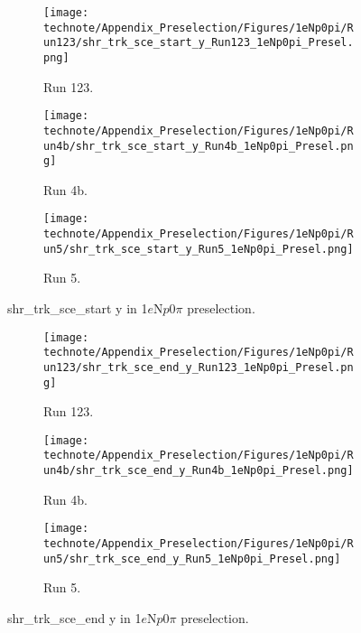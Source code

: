 \begin{figure}[H]
    \centering
    \begin{subfigure}[t]{0.32\linewidth}
        \texttt{[image: technote/Appendix\_Preselection/Figures/1eNp0pi/Run123/shr\_trk\_sce\_start\_y\_Run123\_1eNp0pi\_Presel.png]}
        \caption{Run 123.}
    \end{subfigure}%
    \hspace{0.2cm}%
    \begin{subfigure}[t]{0.32\linewidth}
        \texttt{[image: technote/Appendix\_Preselection/Figures/1eNp0pi/Run4b/shr\_trk\_sce\_start\_y\_Run4b\_1eNp0pi\_Presel.png]}
        \caption{Run 4b.}
    \end{subfigure}%
    \hspace{0.2cm}%
    \begin{subfigure}[t]{0.32\linewidth}
        \texttt{[image: technote/Appendix\_Preselection/Figures/1eNp0pi/Run5/shr\_trk\_sce\_start\_y\_Run5\_1eNp0pi\_Presel.png]}
        \caption{Run 5.}
    \end{subfigure}
    \caption{shr\_trk\_sce\_start y in 1$e$N$p$0$\pi$ preselection.}
\end{figure}

\begin{figure}[H]
    \centering
    \begin{subfigure}[t]{0.32\linewidth}
        \texttt{[image: technote/Appendix\_Preselection/Figures/1eNp0pi/Run123/shr\_trk\_sce\_end\_y\_Run123\_1eNp0pi\_Presel.png]}
        \caption{Run 123.}
    \end{subfigure}%
    \hspace{0.2cm}%
    \begin{subfigure}[t]{0.32\linewidth}
        \texttt{[image: technote/Appendix\_Preselection/Figures/1eNp0pi/Run4b/shr\_trk\_sce\_end\_y\_Run4b\_1eNp0pi\_Presel.png]}
        \caption{Run 4b.}
    \end{subfigure}%
    \hspace{0.2cm}%
    \begin{subfigure}[t]{0.32\linewidth}
        \texttt{[image: technote/Appendix\_Preselection/Figures/1eNp0pi/Run5/shr\_trk\_sce\_end\_y\_Run5\_1eNp0pi\_Presel.png]}
        \caption{Run 5.}
    \end{subfigure}
    \caption{shr\_trk\_sce\_end y in 1$e$N$p$0$\pi$ preselection.}
\end{figure}


